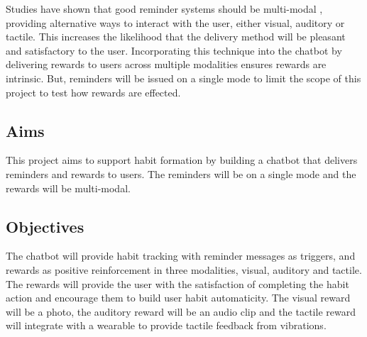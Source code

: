 Studies have shown that good reminder systems should be multi-modal \cite{article_designing_multimodal_reminders_for_home}, providing alternative ways to interact with the user, either visual, auditory or tactile. This increases the likelihood that the delivery method will be pleasant and satisfactory to the user. Incorporating this technique into the chatbot by delivering rewards to users across multiple modalities ensures rewards are intrinsic. But, reminders will be issued on a single mode to limit the scope of this project to test how rewards are effected.

\subsection*{Aims}
This project aims to support habit formation by building a chatbot that delivers reminders and rewards to users. The reminders will be on a single mode and the rewards will be multi-modal.

\subsection*{Objectives}
The chatbot will provide habit tracking with reminder messages as triggers, and rewards as positive reinforcement in three modalities, visual, auditory and tactile.\newline
\newline
The rewards will provide the user with the satisfaction of completing the habit action and encourage them to build user habit automaticity. The visual reward will be a photo, the auditory reward will be an audio clip and the tactile reward will integrate with a wearable to provide tactile feedback from vibrations.

